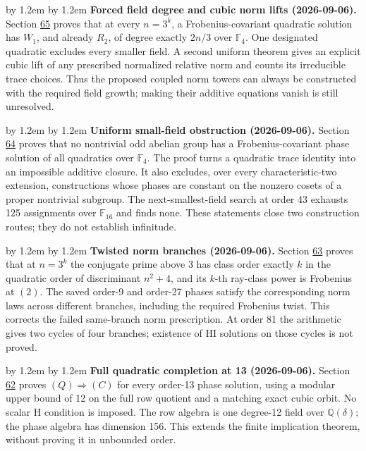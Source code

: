 \documentclass[11pt,reqno]{amsart}
\theoremstyle{plain}
\newenvironment{revnote}%
  {\par\addvspace{0.7\baselineskip}\begingroup\small
   \advance\leftskip by 1.2em \advance\rightskip by 1.2em \noindent\ignorespaces}%
  {\par\endgroup\addvspace{0.7\baselineskip}}
\begin{document}
\begin{revnote}
\textbf{Forced field degree and cubic norm lifts (2026-09-06).} Section \hyperref[sec:65]{65} proves that at every \(n=3^k\), a Frobenius-covariant quadratic solution has \(W_1\), and already \(R_2\), of degree exactly \(2n/3\) over \(\mathbb F_4\). One designated quadratic excludes every smaller field. A second uniform theorem gives an explicit cubic lift of any prescribed normalized relative norm and counts its irreducible trace choices. Thus the proposed coupled norm towers can always be constructed with the required field growth; making their additive equations vanish is still unresolved.
\end{revnote}

\begin{revnote}
\textbf{Uniform small-field obstruction (2026-09-06).} Section \hyperref[sec:64]{64} proves that no nontrivial odd abelian group has a Frobenius-covariant phase solution of all quadratics over \(\mathbb F_4\). The proof turns a quadratic trace identity into an impossible additive closure. It also excludes, over every characteristic-two extension, constructions whose phases are constant on the nonzero cosets of a proper nontrivial subgroup. The next-smallest-field search at order 43 exhausts 125 assignments over \(\mathbb F_{16}\) and finds none. These statements close two construction routes; they do not establish infinitude.
\end{revnote}

\begin{revnote}
\textbf{Twisted norm branches (2026-09-06).} Section \hyperref[sec:63]{63} proves that at \(n=3^k\) the conjugate prime above 3 has class order exactly \(k\) in the quadratic order of discriminant \(n^2+4\), and its \(k\)-th ray-class power is Frobenius at \((2)\). The saved order-9 and order-27 phases satisfy the corresponding norm laws across different branches, including the required Frobenius twist. This corrects the failed same-branch norm prescription. At order 81 the arithmetic gives two cycles of four branches; existence of HI solutions on those cycles is not proved.
\end{revnote}

\begin{revnote}
\textbf{Full quadratic completion at 13 (2026-09-06).} Section \hyperref[sec:62]{62} proves \((Q)\Rightarrow(C)\) for every order-13 phase solution, using a modular upper bound of 12 on the full row quotient and a matching exact cubic orbit. No scalar H condition is imposed. The row algebra is one degree-12 field over \(\mathbb Q(\delta)\); the phase algebra has dimension 156. This extends the finite implication theorem, without proving it in unbounded order.
\end{revnote}
\end{document}
